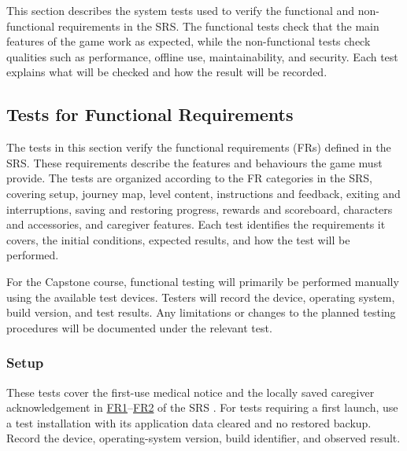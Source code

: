 \documentclass[10pt,titlepage]{article}
\newcommand{\srsurl}{https://team-hindsight.github.io/ophthamology-game/SRS/SRS.pdf}
\newcommand{\srsfrref}[2]{\href{\srsurl\#nameddest=#1}{FR#2}}
\begin{document}
This section describes the system tests used to verify the functional and
non-functional requirements in the SRS. The functional tests check that
the main features of the game work as expected, while the non-functional tests
check qualities such as performance, offline use, maintainability, and security.
Each test explains what will be checked and how the result will be recorded.

\subsection{Tests for Functional Requirements}

The tests in this section verify the functional requirements (FRs)
defined in the SRS. These requirements describe the features and
behaviours the game must provide. The tests are organized according
to the FR categories in the SRS, covering setup, journey map,
level content, instructions and feedback, exiting and interruptions,
saving and restoring progress, rewards and scoreboard, characters
and accessories, and caregiver features. Each test identifies the
requirements it covers, the initial conditions, expected results,
and how the test will be performed.

For the Capstone course, functional testing will primarily be
performed manually using the available test devices. Testers will
record the device, operating system, build version, and test
results. Any limitations or changes to the planned testing
procedures will be documented under the relevant test.

\subsubsection{Setup}\label{sec:AMSetupFRTests}

These tests cover the first-use medical notice and the locally saved
caregiver acknowledgement in \srsfrref{FR_MedicalNotice}{1}--\srsfrref{FR_RecordAck}{2} of the SRS \cite{SRS}.
For tests requiring a first launch, use a test installation with its
application data cleared and no restored backup. Record the device,
operating-system version, build identifier, and observed result.
\end{document}
